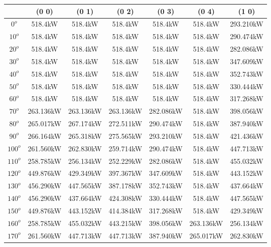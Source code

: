         \singlespacing
        \begin{table}[H]
        	\centering
        	\begin{tabular}{|c|c|c|c|c|c|c|} \hline
        			& (0 0)		& (0 1)		& (0 2)		& (0 3)		& (0 4)		& (1 0)		\\ \hline
		$0^o$	& 518.4kW	& 518.4kW	& 518.4kW	& 518.4kW	& 518.4kW	& 293.210kW	\\ \hline
		$10^o$	& 518.4kW	& 518.4kW	& 518.4kW	& 518.4kW	& 518.4kW	& 290.474kW	\\ \hline
		$20^o$	& 518.4kW	& 518.4kW	& 518.4kW	& 518.4kW	& 518.4kW	& 282.086kW	\\ \hline
		$30^o$	& 518.4kW	& 518.4kW	& 518.4kW	& 518.4kW	& 518.4kW	& 347.609kW	\\ \hline
		$40^o$	& 518.4kW	& 518.4kW	& 518.4kW	& 518.4kW	& 518.4kW	& 352.743kW	\\ \hline
		$50^o$	& 518.4kW	& 518.4kW	& 518.4kW	& 518.4kW	& 518.4kW	& 330.444kW	\\ \hline
		$60^o$	& 518.4kW	& 518.4kW	& 518.4kW	& 518.4kW	& 518.4kW	& 317.268kW	\\ \hline
		$70^o$	& 263.136kW	& 263.136kW	& 263.136kW	& 282.086kW	& 518.4kW	& 398.056kW	\\ \hline
		$80^o$	& 265.017kW	& 267.174kW	& 272.511kW	& 290.474kW	& 518.4kW	& 387.940kW	\\ \hline
		$90^o$	& 266.164kW	& 265.318kW	& 275.565kW	& 293.210kW	& 518.4kW	& 421.436kW	\\ \hline
		$100^o$	& 261.560kW	& 262.830kW	& 259.714kW	& 290.474kW	& 518.4kW	& 447.713kW	\\ \hline
		$110^o$	& 258.785kW	& 256.134kW	& 252.229kW	& 282.086kW	& 518.4kW	& 455.032kW	\\ \hline
		$120^o$	& 449.876kW	& 429.349kW	& 397.367kW	& 347.609kW	& 518.4kW	& 443.152kW	\\ \hline
		$130^o$	& 456.290kW	& 447.565kW	& 387.178kW	& 352.743kW	& 518.4kW	& 437.664kW	\\ \hline
		$140^o$	& 456.290kW	& 437.664kW	& 424.308kW	& 330.444kW	& 518.4kW	& 447.565kW	\\ \hline
		$150^o$	& 449.876kW	& 443.152kW	& 414.384kW	& 317.268kW	& 518.4kW	& 429.349kW	\\ \hline
		$160^o$	& 258.785kW	& 455.032kW	& 443.215kW	& 398.056kW	& 263.136kW	& 256.134kW	\\ \hline
		$170^o$	& 261.560kW	& 447.713kW	& 447.713kW	& 387.940kW	& 265.017kW	& 262.830kW	\\ \hline

\end{tabular}
\end{table}
